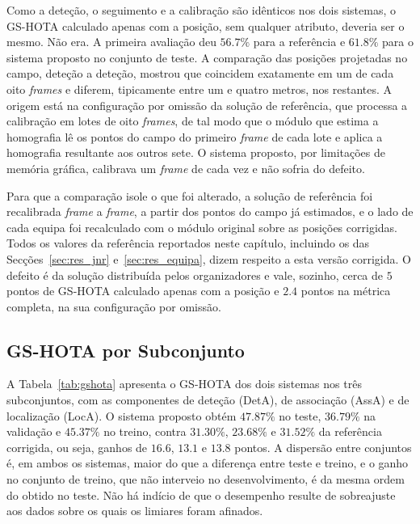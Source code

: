 Como a deteção, o seguimento e a calibração são idênticos nos dois sistemas, o GS-HOTA calculado apenas com a posição, sem qualquer atributo, deveria ser o mesmo. Não era. A primeira avaliação deu $56.7\%$ para a referência e $61.8\%$ para o sistema proposto no conjunto de teste. A comparação das posições projetadas no campo, deteção a deteção, mostrou que coincidem exatamente em um de cada oito \emph{frames} e diferem, tipicamente entre um e quatro metros, nos restantes. A origem está na configuração por omissão da solução de referência, que processa a calibração em lotes de oito \emph{frames}, de tal modo que o módulo que estima a homografia lê os pontos do campo do primeiro \emph{frame} de cada lote e aplica a homografia resultante aos outros sete. O sistema proposto, por limitações de memória gráfica, calibrava um \emph{frame} de cada vez e não sofria do defeito.

Para que a comparação isole o que foi alterado, a solução de referência foi recalibrada \emph{frame} a \emph{frame}, a partir dos pontos do campo já estimados, e o lado de cada equipa foi recalculado com o módulo original sobre as posições corrigidas. Todos os valores da referência reportados neste capítulo, incluindo os das Secções~\ref{sec:res_jnr} e~\ref{sec:res_equipa}, dizem respeito a esta versão corrigida. O defeito é da solução distribuída pelos organizadores e vale, sozinho, cerca de $5$ pontos de GS-HOTA calculado apenas com a posição e $2.4$ pontos na métrica completa, na sua configuração por omissão.

\subsection{GS-HOTA por Subconjunto}\label{sec:res_gshota}

A Tabela~\ref{tab:gshota} apresenta o GS-HOTA dos dois sistemas nos três subconjuntos, com as componentes de deteção (DetA), de associação (AssA) e de localização (LocA). O sistema proposto obtém $47.87\%$ no teste, $36.79\%$ na validação e $45.37\%$ no treino, contra $31.30\%$, $23.68\%$ e $31.52\%$ da referência corrigida, ou seja, ganhos de $16.6$, $13.1$ e $13.8$ pontos. A dispersão entre conjuntos é, em ambos os sistemas, maior do que a diferença entre teste e treino, e o ganho no conjunto de treino, que não interveio no desenvolvimento, é da mesma ordem do obtido no teste. Não há indício de que o desempenho resulte de sobreajuste aos dados sobre os quais os limiares foram afinados.

